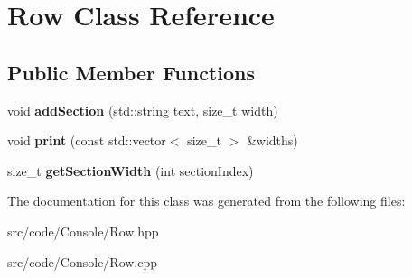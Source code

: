 \hypertarget{class_row}{}\section{Row Class Reference}
\label{class_row}
\subsection*{Public Member Functions}
\begin{DoxyCompactItemize}
\item 
\mbox{\label{class_row_a57369f24401a28e8323c276060418d79}} 
void {\bfseries add\+Section} (std\+::string text, size\+\_\+t width)
\item 
\mbox{\label{class_row_ad5b5f2b44e582b3828bca6cf67455577}} 
void {\bfseries print} (const std\+::vector$<$ size\+\_\+t $>$ \&widths)
\item 
\mbox{\label{class_row_a9ad5859c048f68ea205f11b5726c44c4}} 
size\+\_\+t {\bfseries get\+Section\+Width} (int section\+Index)
\end{DoxyCompactItemize}


The documentation for this class was generated from the following files\+:\begin{DoxyCompactItemize}
\item 
src/code/\+Console/Row.\+hpp\item 
src/code/\+Console/Row.\+cpp\end{DoxyCompactItemize}
